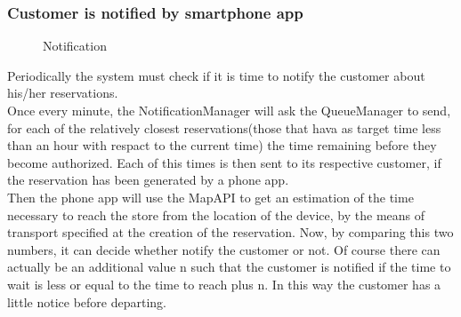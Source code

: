 \subsubsection{Customer is notified by smartphone app}
\begin{figure}[H]
	\noindent
	\caption{Notification}
\end{figure}
Periodically the system must check if it is time to notify the customer about his/her reservations.\\
Once every minute, the NotificationManager will ask the QueueManager to send, for each of the relatively closest reservations(those that hava as target time less than an hour with respact to the current time) the time remaining before they become authorized. Each of this times is then sent to its respective customer, if the reservation has been generated by a phone app.\\
Then the phone app will use the MapAPI to get an estimation of the time necessary to reach the store from the location of the device, by the means of transport specified at the creation of the reservation. Now, by comparing this two numbers, it can decide whether notify the customer or not. Of course there can actually be an additional value n such that the customer is notified if the time to wait is less or equal to the time to reach plus n. In this way the customer has a little notice before departing.
\newpage
